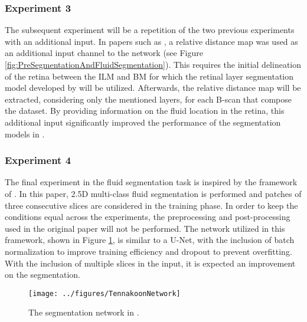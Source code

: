 \subsubsection{Experiment 3}\label{Experiment3}
The subsequent experiment will be a repetition of the two previous experiments with an additional input. In papers such as \parencite{Tang2022, Lu2019, Rahil2023}, a relative distance map was used as an additional input channel to the network (see Figure \ref{fig:PreSegmentationAndFluidSegmentation}). This requires the initial delineation of the retina between the ILM and BM for which the retinal layer segmentation model developed by \textcite{Melo2023} will be utilized. Afterwards, the relative distance map will be extracted, considering only the mentioned layers, for each B-scan that compose the dataset. By providing information on the fluid location in the retina, this additional input significantly improved the performance of the segmentation models in \parencite{Tang2022, Lu2019, Rahil2023}.

\subsubsection{Experiment 4}\label{Experiment4}
The final experiment in the fluid segmentation task is inspired by the framework of \textcite{Tennakoon2018}. In this paper, 2.5D multi-class fluid segmentation is performed and patches of three consecutive slices are considered in the training phase. In order to keep the conditions equal across the experiments, the preprocessing and post-processing used in the original paper will not be performed. The network utilized in this framework, shown in Figure \ref{fig:TennakoonNetwork}, is similar to a U-Net, with the inclusion of batch normalization to improve training efficiency and dropout to prevent overfitting. With the inclusion of multiple slices in the input, it is expected an improvement on the segmentation.

\begin{figure}[!ht]
	\centering
	\texttt{[image: ../figures/TennakoonNetwork]}
	\caption{The segmentation network in \cite{Tennakoon2018}.}
	\label{fig:TennakoonNetwork}
\end{figure}

